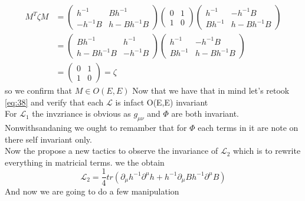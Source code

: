 \documentclass{article}
\begin{document}
\begin{equation*}
    \begin{aligned}
        M^{T}\zeta M &= \begin{pmatrix} h^{-1} & B h^{-1} \\ - h^{-1} B & h-Bh^{-1}B\end{pmatrix} \begin{pmatrix}0 & 1 \\ 1 & 0\end{pmatrix}\begin{pmatrix}    h^{-1} & -h^{-1}B \\Bh^{-1} & h-Bh^{-1}B\end{pmatrix}\\
        & =\begin{pmatrix}B h^{-1}   &h^{-1}  \\h-Bh^{-1}B   &- h^{-1} B \end{pmatrix} \begin{pmatrix}    h^{-1} & -h^{-1}B \\Bh^{-1} & h-Bh^{-1}B\end{pmatrix}\\
        &= \begin{pmatrix}0 & 1 \\ 1 & 0\end{pmatrix} = \zeta
    \end{aligned}
\end{equation*}
so we confirm that $M \in O(E,E)$
Now that we have that in mind let's retook \eqref{eq:38} and verify that each $\mathcal{L}$ is infact O(E,E) invariant \\
For $\mathcal{L}_1$ the invzriance is obvious as $g_{\mu \nu}$ and $ \Phi$ are  both invariant. Nonwithsandaning we ought to remamber that for $\Phi$ each terms in it are note on there self invariant only.\\
Now the \cite{maharana1993noncompact} propose a new tactics to observe the invariance of $\mathcal{L}_2$ which is to rewrite everything in matricial terms.
we the obtain
\begin{equation*}
    \mathcal{L}_2 = \frac{1}{4}tr(\partial_{\mu}h^{-1}\partial^{\mu}h + h^{-1}\partial_\mu Bh^{-1}\partial^{\mu}B)
\end{equation*}
And now we are going to do a few manipulation
\end{document}
